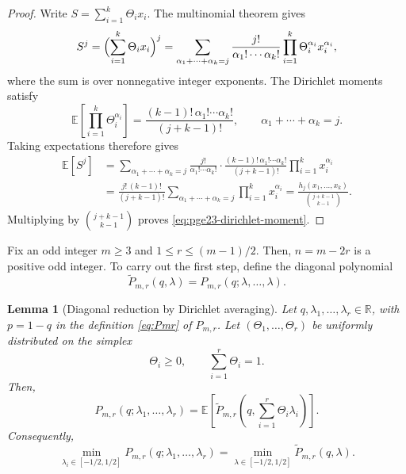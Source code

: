 \documentclass[11pt]{article}
\newtheorem{lemma}[theorem]{Lemma}
\theoremstyle{remark}
\numberwithin{equation}{section}
\newcommand{\R}{\mathbb R}
\newcommand{\E}{\mathbb E}
\begin{document}
\begin{proof}
  Write $S=\sum_{i=1}^k\Theta_i x_i$. The multinomial theorem gives
  \[
    S^j=\Bigl(\sum_{i=1}^k\Theta_i x_i\Bigr)^j
    =\sum_{\alpha_1+\cdots+\alpha_k=j}
    \frac{j!}{\alpha_1!\cdots\alpha_k!}
    \prod_{i=1}^k\Theta_i^{\alpha_i}x_i^{\alpha_i},
  \]
  where the sum is over nonnegative integer exponents.
  The Dirichlet moments satisfy
  \[
    \E\left[\prod_{i=1}^k\Theta_i^{\alpha_i}\right]
    =\frac{(k-1)!\,\alpha_1!\cdots\alpha_k!}{(j+k-1)!},
    \qquad \alpha_1+\cdots+\alpha_k=j.
  \]
  Taking expectations therefore gives
  \begin{align*}
    \E\left[S^j\right]
    &=\sum_{\alpha_1+\cdots+\alpha_k=j}
    \frac{j!}{\alpha_1!\cdots\alpha_k!}
    \cdot\frac{(k-1)!\,\alpha_1!\cdots\alpha_k!}{(j+k-1)!}
    \prod_{i=1}^k x_i^{\alpha_i}\\
    &=\frac{j!\,(k-1)!}{(j+k-1)!}
    \sum_{\alpha_1+\cdots+\alpha_k=j}\prod_{i=1}^k x_i^{\alpha_i}
    =\frac{h_j(x_1,\ldots,x_k)}{\binom{j+k-1}{k-1}}.
  \end{align*}
  Multiplying by $\binom{j+k-1}{k-1}$ proves
  \eqref{eq:pge23-dirichlet-moment}.
\end{proof}

Fix an odd integer $m\ge3$ and $1\le r\le(m-1)/2$. Then, $n=m-2r$ is a positive odd integer.
To carry out the first step, define the diagonal polynomial
\begin{equation}\label{eq:pge23-Ptilde}
  \widetilde P_{m,r}(q,\lambda)
  =P_{m,r}(q;\lambda,\ldots,\lambda).
\end{equation}

\begin{lemma}[Diagonal reduction by Dirichlet averaging]\label{lem:pge23-dirichlet}
  Let $q,\lambda_1,\ldots,\lambda_r\in\R$, with $p=1-q$ in
  the definition \eqref{eq:Pmr} of $P_{m,r}$.
  Let $(\Theta_1,\ldots,\Theta_r)$ be uniformly distributed on the simplex
  \[
    \Theta_i\ge0,\qquad \sum_{i=1}^r\Theta_i=1.
  \]
  Then,
  \begin{equation}\label{eq:pge23-dirichlet-identity}
    P_{m,r}(q;\lambda_1,\ldots,\lambda_r)
    =\E\left[\widetilde P_{m,r}
    \left(q,\sum_{i=1}^r\Theta_i\lambda_i\right)\right].
  \end{equation}
  Consequently,
  \begin{equation*}
    \min_{\lambda_i\in[-1/2,1/2]}
    P_{m,r}(q;\lambda_1,\ldots,\lambda_r)
    =\min_{\lambda\in[-1/2,1/2]}\widetilde P_{m,r}(q,\lambda).
  \end{equation*}
\end{lemma}
\end{document}
